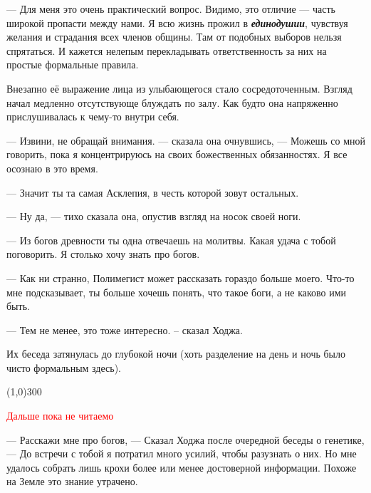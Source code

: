 \documentclass[12pt,a4paper]{article}
\newcommand{\tr}[1]{\textcolor{red}{#1}}
\newcommand{\sep}{
	\begin{center}
		\line(1,0){300}
	\end{center}
}
\begin{document}
--- Для меня это очень практический вопрос. Видимо, это отличие --- часть широкой пропасти между нами. Я всю жизнь прожил в \textbf{\textit{единодушии}}, чувствуя желания и страдания всех членов общины. Там от подобных выборов нельзя спрятаться. И кажется нелепым перекладывать ответственность за них на простые формальные правила.


Внезапно её выражение лица из улыбающегося стало сосредоточенным. Взгляд начал медленно отсутствующе блуждать по залу. Как будто она напряженно прислушивалась к чему-то внутри себя.

--- Извини, не обращай внимания. --- сказала она очнувшись, --- Можешь со мной говорить, пока я концентрируюсь на своих божественных обязанностях. Я все осознаю в это время.

--- Значит ты та самая Асклепия, в честь которой зовут остальных.

--- Ну да, --- тихо сказала она, опустив взгляд на носок своей ноги.

--- Из богов древности ты одна отвечаешь на молитвы. Какая удача с тобой поговорить. Я столько хочу знать про богов.

--- Как ни странно, Полимегист может рассказать гораздо больше моего. Что-то мне подсказывает, ты больше хочешь понять, что такое боги, а не каково ими быть.

--- Тем не менее, это тоже интересно. -- сказал Ходжа.

Их беседа затянулась до глубокой ночи (хоть разделение на день и ночь было чисто формальным здесь).


\sep


\tr{\Large \center Дальше пока не читаемо}
\newpage

--- Расскажи мне про богов, --- Сказал Ходжа после очередной беседы о генетике, --- До встречи с тобой я потратил много усилий, чтобы разузнать о них. Но мне удалось собрать лишь крохи более или менее достоверной информации. Похоже на Земле это знание утрачено.
\end{document}
